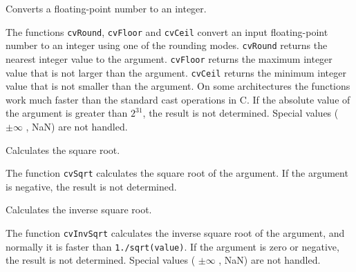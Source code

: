 \label{Round, Floor, Ceil}

Converts a floating-point number to an integer.


\begin{description}
\end{description}


The functions \texttt{cvRound}, \texttt{cvFloor} and \texttt{cvCeil}
convert an input floating-point number to an integer using one of the rounding
modes. \texttt{cvRound} returns the nearest integer value to the
argument. \texttt{cvFloor} returns the maximum integer value that is not
larger than the argument. \texttt{cvCeil} returns the minimum integer
value that is not smaller than the argument. On some architectures the
functions work much faster than the standard cast
operations in C. If the absolute value of the argument is greater than
$2^{31}$, the result is not determined. Special values ( $ \pm \infty$ , NaN)
are not handled.

\label{Sqrt}

Calculates the square root.


\begin{description}
\end{description}


The function \texttt{cvSqrt} calculates the square root of the argument. If the argument is negative, the result is not determined.

\label{InvSqrt}

Calculates the inverse square root.


\begin{description}
\end{description}


The function \texttt{cvInvSqrt} calculates the inverse square root of the argument, and normally it is faster than \texttt{1./sqrt(value)}. If the argument is zero or negative, the result is not determined. Special values ( $ \pm \infty $ , NaN) are not handled.

